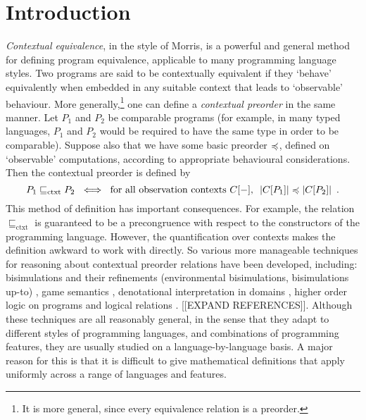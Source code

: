 \section{Introduction}



\emph{Contextual equivalence}, in the style of Morris,
is a powerful and general method for defining program equivalence, applicable to many 
programming language styles. 
Two programs are said to be contextually equivalent if 
they `behave' equivalently when embedded in any suitable context that leads to `observable' behaviour. 
More generally,\footnote{It is more general, since every equivalence relation is a preorder.} one can define a \emph{contextual preorder} in the same manner. Let $P_1$ and $P_2$ be comparable programs (for example, in many typed languages, $P_1$ and $P_2$ would be required to have the same type in order to be comparable). Suppose also that we have some {basic preorder} $\preccurlyeq$, defined on `observable' computations, according to appropriate behavioural considerations. Then the contextual preorder is defined by
\[ P_1 \sqsubseteq_\text{ctxt} P_2 ~ \iff ~
\text{for all observation contexts $C[-]$, $~ |C[P_1]| \preccurlyeq |C[P_2]|$} \enspace . \]
This method of definition has important consequences. For example, the relation
$\sqsubseteq_\text{ctxt}$ is guaranteed to be a precongruence with respect 
to the constructors of the programming language.
However, the quantification over contexts makes the definition awkward to work with directly.
So various more manageable techniques for reasoning about contextual preorder relations have been developed, including:
 bisimulations 
and their refinements (environmental bisimulations, 
bisimulations up-to) \cite{koutavas2011applicative}, 
game semantics \cite{abramsky1999game}, 
denotational interpretation in domains \cite{scott1982domains}, 
higher order logic on 
programs \cite{honda2005observationally} 
and logical relations \cite{Pitts2000}. [[EXPAND REFERENCES]].
Although these techniques are all reasonably general, in the sense that they adapt to different styles of programming languages, and combinations of programming features, they are usually studied on a language-by-language basis.
A major reason for this is that it is difficult to give mathematical definitions that apply uniformly across a range of languages and features. 

